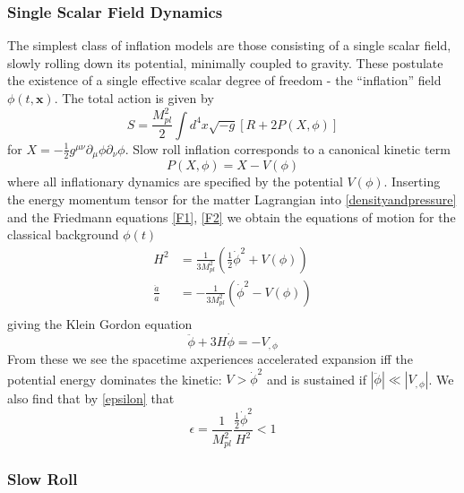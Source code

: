 \documentclass[a4paper,10pt]{article}
\renewcommand{\v}[1]{\mathbf{#1}}
\newcommand{\Mp}{M_{pl}}
\newcommand{\half}{\frac{1}{2}}
\begin{document}
\subsubsection{Single Scalar Field Dynamics}

The simplest class of inflation models are those consisting of a single scalar field, slowly rolling down its potential, minimally coupled to gravity. These postulate the existence of a single effective scalar degree of freedom - the ``inflation'' field $\phi(t,\v{x})$. The total action is given by
\begin{equation}
S = \frac{\Mp^2}{2} \int d^4x \sqrt{-g}[R+2P(X,\phi)] 
\label{inflationaction}
\end{equation}
for $X=-\half g^{\mu\nu}\partial_\mu\phi\partial_\nu\phi$. Slow roll inflation corresponds to a canonical kinetic term 
\begin{equation}
P(X,\phi) = X - V(\phi)
\end{equation}
where all inflationary dynamics are specified by the potential $V(\phi)$. Inserting the energy momentum tensor for the matter Lagrangian into \ref{densityandpressure} and the Friedmann equations \ref{F1}, \ref{F2} we obtain the equations of motion for the classical background $\phi(t)$
\begin{equation}\begin{split}
H^2 &= \frac{1}{3\Mp^2}\left(\half\dot{\phi}^2+V(\phi)\right)\\
\frac{\ddot{a}}{a} &= -\frac{1}{3\Mp^2}\left(\dot{\phi}^2-V(\phi)\right)\\
\end{split}\end{equation}
giving the Klein Gordon equation
\begin{equation}
\tag{KG}
\label{KG}
\ddot{\phi}+3H\dot{\phi}=-V_{,\phi}
\end{equation}
From these we see the spacetime axperiences accelerated expansion iff the potential energy dominates the kinetic: $V > \dot{\phi}^2$ and is sustained if $|\ddot{\phi}| \ll |V_{,\phi}|$. We also find that by \ref{epsilon} that 
\begin{equation}
\epsilon = \frac{1}{\Mp^2}\frac{\half\dot{\phi}^2}{H^2} < 1
\end{equation}

\subsubsection{Slow Roll}
\end{document}
